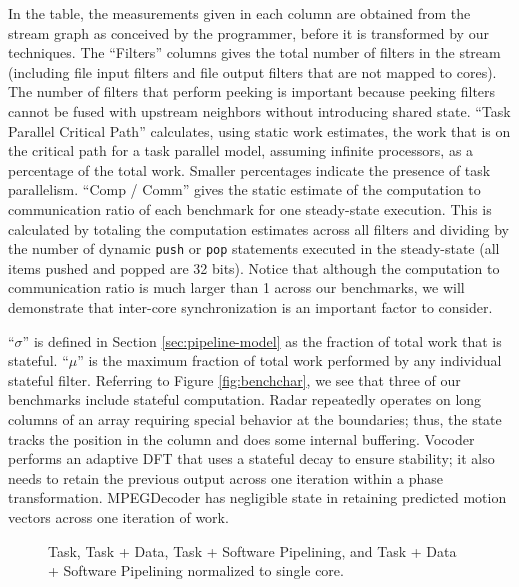 In the table, the measurements given in each column are obtained from
the stream graph as conceived by the programmer, before it is
transformed by our techniques.  The ``Filters'' columns gives the
total number of filters in the stream (including file input filters
and file output filters that are not mapped to cores).  The number of
filters that perform peeking is important because peeking filters
cannot be fused with upstream neighbors without introducing shared
state. ``Task Parallel Critical Path'' calculates, using static work
estimates, the work that is on the critical path for a task parallel
model, assuming infinite processors, as a percentage of the total
work.  Smaller percentages indicate the presence of task parallelism.
``Comp / Comm'' gives the static estimate of the computation to
communication ratio of each benchmark for one steady-state
execution. This is calculated by totaling the computation estimates
across all filters and dividing by the number of dynamic {\tt push} or
{\tt pop} statements executed in the steady-state (all items pushed
and popped are 32 bits). Notice that although the computation to
communication ratio is much larger than 1 across our benchmarks, we
will demonstrate that inter-core synchronization is an important
factor to consider.

``$\sigma$'' is defined in Section \ref{sec:pipeline-model} as the
fraction of total work that is stateful.  ``$\mu$'' is the maximum
fraction of total work performed by any individual stateful
filter. Referring to Figure \ref{fig:benchchar}, we see that three of
our benchmarks include stateful computation.  Radar repeatedly
operates on long columns of an array requiring special behavior at the
boundaries; thus, the state tracks the position in the column and does
some internal buffering.  Vocoder performs an adaptive DFT that uses a
stateful decay to ensure stability; it also needs to retain the
previous output across one iteration within a phase transformation.
MPEGDecoder has negligible state in retaining predicted motion vectors
across one iteration of work.

\begin{figure*}[t]
\centering
{}
\caption{Task, Task + Data, Task + Software Pipelining, and Task + Data + Software Pipelining
normalized to single core.
\protect\label{fig:main_comp}}
\vspace{-6pt}
\end{figure*}

